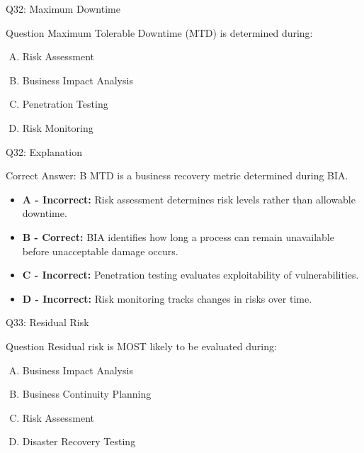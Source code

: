 \documentclass{beamer}
\begin{document}
	\begin{frame}{Q32: Maximum Downtime}
		\begin{block}{Question}
			Maximum Tolerable Downtime (MTD) is determined during:
		\end{block}
		
		\begin{enumerate}[(A)]
			\item Risk Assessment
			\item Business Impact Analysis
			\item Penetration Testing
			\item Risk Monitoring
		\end{enumerate}
	\end{frame}
	
	\begin{frame}{Q32: Explanation}
		\begin{block}{Correct Answer: B}
			MTD is a business recovery metric determined during BIA.
		\end{block}
		
		\begin{itemize}
			\item \textbf{A - Incorrect:} Risk assessment determines risk levels rather than allowable downtime.
			\item \textbf{B - Correct:} BIA identifies how long a process can remain unavailable before unacceptable damage occurs.
			\item \textbf{C - Incorrect:} Penetration testing evaluates exploitability of vulnerabilities.
			\item \textbf{D - Incorrect:} Risk monitoring tracks changes in risks over time.
		\end{itemize}
	\end{frame}
	
	\begin{frame}{Q33: Residual Risk}
		\begin{block}{Question}
			Residual risk is MOST likely to be evaluated during:
		\end{block}
		
		\begin{enumerate}[(A)]
			\item Business Impact Analysis
			\item Business Continuity Planning
			\item Risk Assessment
			\item Disaster Recovery Testing
		\end{enumerate}
	\end{frame}
	
\end{document}
